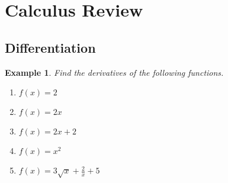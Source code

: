 \documentclass[12pt]{amsart}
\newtheorem{example}[theorem]{Example}
\begin{document}
{\huge  
\section*{Calculus Review }
}

{\large 




\vspace{.5cm}



\subsection{Differentiation}

\begin{example} Find the derivatives of the following functions.

\begin{enumerate}

\item $f(x) = 2$

\vspace{3cm}

\item $f(x) = 2x$

\vspace{3cm}

\item $f(x) = 2x+2$

\vspace{3cm}

\item $f(x) = x^2$

\vspace{3cm}


\item $f(x) = 3\sqrt{x}+\frac2x+5$

\vspace{3cm}


\end{enumerate}
\end{example}}
\end{document}
